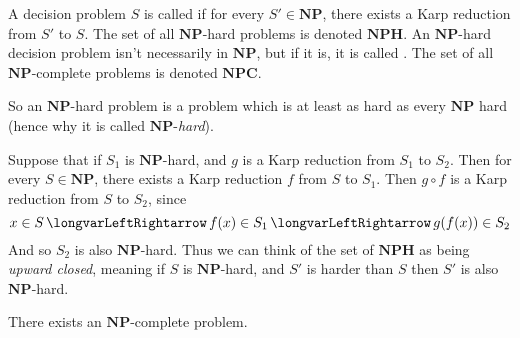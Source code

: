 \documentclass[10pt]{article}
\def\iff{\,\longvarLeftRightarrow\,}
\def\NP{\mathbf{NP}}
\def\NPH{\mathbf{NPH}}
\def\NPC{\mathbf{NPC}}
\begin{document}


\bigskip

\begin{defn*}

    A decision problem $S$ is called \ppemph{$\NP$-hard} if for every $S'\in\NP$, there exists a Karp reduction from $S'$ to $S$.
    The set of all $\NP$-hard problems is denoted $\NPH$.
    An $\NP$-hard decision problem isn't necessarily in $\NP$, but if it is, it is called \ppemph{$\NP$-complete}.
    The set of all $\NP$-complete problems is denoted $\NPC$.

\end{defn*}

So an $\NP$-hard problem is a problem which is at least as hard as every $\NP$ hard (hence why it is called $\NP$-\emph{hard}).

Suppose that if $S_1$ is $\NP$-hard, and $g$ is a Karp reduction from $S_1$ to $S_2$.
Then for every $S\in\NP$, there exists a Karp reduction $f$ from $S$ to $S_1$.
Then $g\circ f$ is a Karp reduction from $S$ to $S_2$, since
\[ x\in S \iff f(x)\in S_1 \iff g(f(x))\in S_2 \]
And so $S_2$ is also $\NP$-hard.
Thus we can think of the set of $\NPH$ as being \emph{upward closed}, meaning if $S$ is $\NP$-hard, and $S'$ is harder than $S$ then $S'$ is also $\NP$-hard.

\begin{prop*}

    There exists an $\NP$-complete problem.

\end{prop*}
\end{document}
